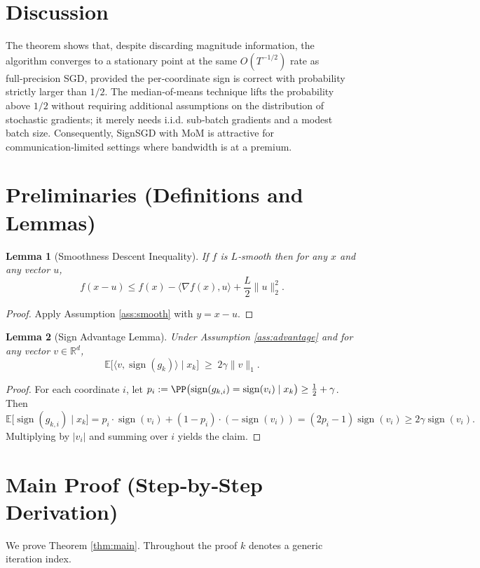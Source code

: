 \documentclass{article}
\newtheorem{lemma}{Lemma}
\newcommand{\sign}{\operatorname{sign}}
\newcommand{\EE}{\mathbb{E}}
\newcommand{\RR}{\mathbb{R}}
\begin{document}
\section*{Discussion}
The theorem shows that, despite discarding magnitude information, the algorithm converges to a stationary point at the same $O(T^{-1/2})$ rate as full‑precision SGD, provided the per‑coordinate sign is correct with probability strictly larger than $1/2$.  The median‑of‑means technique lifts the probability above $1/2$ without requiring additional assumptions on the distribution of stochastic gradients; it merely needs i.i.d. sub‑batch gradients and a modest batch size.  Consequently, SignSGD with MoM is attractive for communication‑limited settings where bandwidth is at a premium.

\newpage
\section*{Preliminaries (Definitions and Lemmas)}
\begin{lemma}[Smoothness Descent Inequality]\label{lem:smooth}
If $f$ is $L$‑smooth then for any $x$ and any vector $u$,
\[
f(x-u)\le f(x)-\langle\nabla f(x),u\rangle+\frac{L}{2}\|u\|_{2}^{2}.
\]
\end{lemma}
\begin{proof}
Apply Assumption \ref{ass:smooth} with $y = x-u$.
\end{proof}

\begin{lemma}[Sign Advantage Lemma]\label{lem:signadv}
Under Assumption \ref{ass:advantage} and for any vector $v\in\RR^{d}$,
\[
\EE\!\bigl[\langle v,\sign(g_{k})\rangle\mid x_{k}\bigr]\;\ge\;2\gamma\|v\|_{1}.
\]
\end{lemma}
\begin{proof}
For each coordinate $i$, let $p_{i}:=\PP\bigl(\sign(g_{k,i})=\sign(v_{i})\mid x_{k}\bigr)\ge\frac12+\gamma$.  
Then
\[
\EE\!\bigl[\sign(g_{k,i})\mid x_{k}\bigr]
= p_{i}\cdot\sign(v_{i})+(1-p_{i})\cdot(-\sign(v_{i}))
= (2p_{i}-1)\sign(v_{i})\ge 2\gamma\sign(v_{i}).
\]
Multiplying by $|v_{i}|$ and summing over $i$ yields the claim.
\end{proof}

\section*{Main Proof (Step‑by‑Step Derivation)}
We prove Theorem \ref{thm:main}.  Throughout the proof $k$ denotes a generic iteration index.
\end{document}
